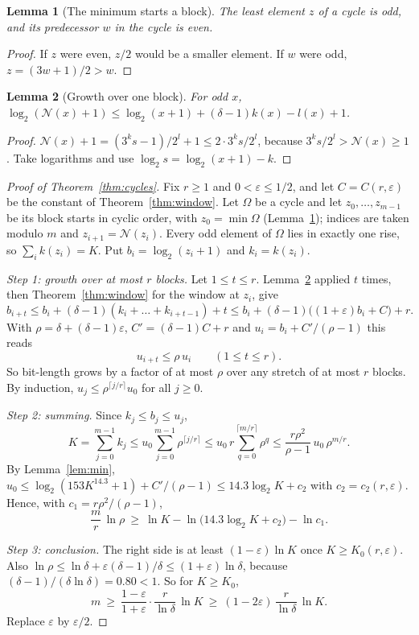 \documentclass[11pt]{amsart}
\newtheorem{lemma}{Lemma}
\theoremstyle{remark}
\newcommand{\N}{\mathcal{N}}
\newcommand{\Om}{\Omega}
\begin{document}
\begin{lemma}[The minimum starts a block]\label{lem:start}
The least element $z$ of a cycle is odd, and its predecessor $w$ in the cycle is even.
\end{lemma}

\begin{proof}
If $z$ were even, $z/2$ would be a smaller element. If $w$ were odd, $z=(3w+1)/2>w$.
\end{proof}

\begin{lemma}[Growth over one block]\label{lem:growth}
For odd $x$, $\log_2(\N(x)+1)\le\log_2(x+1)+(\delta-1)k(x)-l(x)+1$.
\end{lemma}

\begin{proof}
$\N(x)+1=(3^ks-1)/2^l+1\le 2\cdot3^ks/2^l$, because $3^ks/2^l>\N(x)\ge 1$. Take logarithms
and use $\log_2s=\log_2(x+1)-k$.
\end{proof}

\begin{proof}[Proof of Theorem~\ref{thm:cycles}]
Fix $r\ge 1$ and $0<\varepsilon\le 1/2$, and let $C=C(r,\varepsilon)$ be the constant of
Theorem~\ref{thm:window}. Let $\Om$ be a cycle and let $z_0,\dots,z_{m-1}$ be its block
starts in cyclic order, with $z_0=\min\Om$ (Lemma~\ref{lem:start}); indices are taken modulo
$m$ and $z_{i+1}=\N(z_i)$. Every odd element of $\Om$ lies in exactly one rise, so
$\sum_ik(z_i)=K$. Put $b_i=\log_2(z_i+1)$ and $k_i=k(z_i)$.

\emph{Step 1: growth over at most $r$ blocks.} Let $1\le t\le r$.
Lemma~\ref{lem:growth} applied $t$ times, then Theorem~\ref{thm:window} for the window at
$z_i$, give
\[
b_{i+t}\le b_i+(\delta-1)(k_i+\dots+k_{i+t-1})+t
\le b_i+(\delta-1)\bigl((1+\varepsilon)b_i+C\bigr)+r .
\]
With $\rho=\delta+(\delta-1)\varepsilon$, $C'=(\delta-1)C+r$ and $u_i=b_i+C'/(\rho-1)$ this
reads
\[
u_{i+t}\le\rho\,u_i\qquad(1\le t\le r).
\]
So bit-length grows by a factor of at most $\rho$ over any stretch of at most $r$ blocks.
By induction, $u_j\le\rho^{\lceil j/r\rceil}u_0$ for all $j\ge 0$.

\emph{Step 2: summing.} Since $k_j\le b_j\le u_j$,
\[
K=\sum_{j=0}^{m-1}k_j\le u_0\sum_{j=0}^{m-1}\rho^{\lceil j/r\rceil}
\le u_0\,r\sum_{q=0}^{\lceil m/r\rceil}\rho^q
\le\frac{r\rho^2}{\rho-1}\,u_0\,\rho^{m/r}.
\]
By Lemma~\ref{lem:min}, $u_0\le\log_2(153K^{14.3}+1)+C'/(\rho-1)\le 14.3\log_2K+c_2$ with
$c_2=c_2(r,\varepsilon)$. Hence, with $c_1=r\rho^2/(\rho-1)$,
\[
\frac mr\,\ln\rho\ \ge\ \ln K-\ln\bigl(14.3\log_2K+c_2\bigr)-\ln c_1 .
\]

\emph{Step 3: conclusion.} The right side is at least $(1-\varepsilon)\ln K$ once
$K\ge K_0(r,\varepsilon)$. Also
$\ln\rho\le\ln\delta+\varepsilon(\delta-1)/\delta\le(1+\varepsilon)\ln\delta$, because
$(\delta-1)/(\delta\ln\delta)=0.80<1$. So for $K\ge K_0$,
\[
m\ \ge\ \frac{1-\varepsilon}{1+\varepsilon}\cdot\frac{r}{\ln\delta}\,\ln K
\ \ge\ (1-2\varepsilon)\,\frac{r}{\ln\delta}\,\ln K .
\]
Replace $\varepsilon$ by $\varepsilon/2$.
\end{proof}
\end{document}
